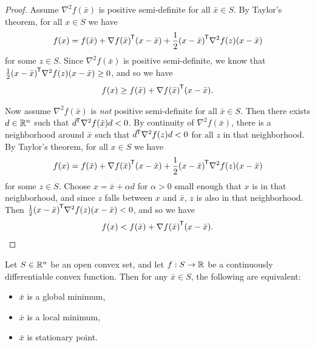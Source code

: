 \begin{proof}\proofbreak
    Assume $\nabla^2f(\bar{x})$ is positive semi-definite for all $\bar{x} \in S$. By Taylor's theorem, for all $x \in S$ we have
    \begin{align*}
        f(x) = f(\bar{x}) + {\nabla f(\bar{x})}^{\mkern-1.5mu\mathsf{T}}(x - \bar{x}) + \frac{1}{2}{(x - \bar{x})}^{\mkern-1.5mu\mathsf{T}}\nabla^2f(z)(x - \bar{x})
    \end{align*}
    for some $z \in S$. Since $\nabla^2f(\bar{x})$ is positive semi-definite, we know that $\frac{1}{2}{(x - \bar{x})}^{\mkern-1.5mu\mathsf{T}}\nabla^2f(z)(x - \bar{x}) \geq 0$, and so we have
    \begin{align*}
        f(x) \geq f(\bar{x}) + {\nabla f(\bar{x})}^{\mkern-1.5mu\mathsf{T}}(x - \bar{x}).
    \end{align*}

    Now assume $\nabla^2f(\bar{x})$ is \emph{not} positive semi-definite for all $\bar{x} \in S$. Then there exists $d \in \mathbb{R}^n$ such that ${d}^{\mkern-1.5mu\mathsf{T}}\nabla^2f(\bar{x})d < 0$. By continuity of $\nabla^2f(\bar{x})$, there is a neighborhood around $\bar{x}$ such that ${d}^{\mkern-1.5mu\mathsf{T}}\nabla^2f(z)d < 0$ for all $z$ in that neighborhood. By Taylor's theorem, for all $x \in S$ we have
    \begin{align*}
        f(x) = f(\bar{x}) + {\nabla f(\bar{x})}^{\mkern-1.5mu\mathsf{T}}(x - \bar{x}) + \frac{1}{2}{(x - \bar{x})}^{\mkern-1.5mu\mathsf{T}}\nabla^2f(z)(x - \bar{x})
    \end{align*}
    for some $z \in S$. Choose $x = \bar{x} + \alpha d$ for $\alpha > 0$ small enough that $x$ is in that neighborhood, and since $z$ falls between $x$ and $\bar{x}$, $z$ is also in that neighborhood. Then $\frac{1}{2}{(x - \bar{x})}^{\mkern-1.5mu\mathsf{T}}\nabla^2f(z)(x - \bar{x}) < 0$, and so we have
    \begin{align*}
        f(x) < f(\bar{x}) + {\nabla f(\bar{x})}^{\mkern-1.5mu\mathsf{T}}(x - \bar{x}).
    \end{align*}
\end{proof}

\begin{prop}
    Let $S \in \mathbb{R}^n$ be an open convex set, and let $f: S \to \mathbb{R}$ be a continuously differentiable convex function. Then for any $\bar{x} \in S$, the following are equivalent:
    \begin{itemize}
        \item $\bar{x}$ is a global minimum,
        \item $\bar{x}$ is a local minimum,
        \item $\bar{x}$ is stationary point.
    \end{itemize}
\end{prop}

